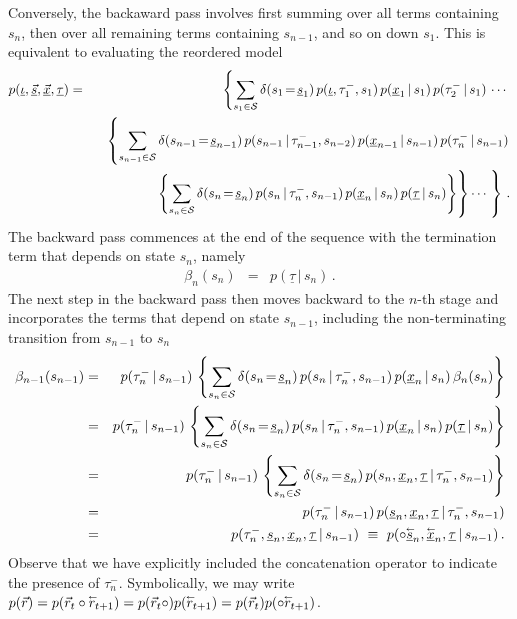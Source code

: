 \documentclass[a4paper]{article}
\newcommand{\rvec}[1]{\accentset{\leftarrow}{#1}}
\newcommand{\ui}{\underline{\iota}}
\newcommand{\ut}{\underline{\tau}}
\newcommand{\vr}{\vec{r}}
\newcommand{\tm}{\tau^{-}}
\begin{document}
Conversely, the backaward pass involves first summing over all terms containing $s_n$,
then over all remaining terms containing $s_{n-1}$, and so on down $s_1$.
This is equivalent to evaluating the reordered model
\begin{eqnarray}
   p(\ui,\underline{\vec{s}},\underline{\vec{x}},\ut) 
& = & 
   \left\{\sum_{s_1\in{\cal S}}\delta(s_1\!=\!\underline{s}_1)\,
p(\ui,\tm_1,s_1)\,p(\underline{x}_1\,|\,s_1)\,p(\tm_2\,|\,s_1)\,
\cdots\right.
\nonumber\\&&
\;\;\;\left\{\sum_{s_{n-1}\in{\cal S}}\delta(s_{n-1}\!=\!\underline{s}_{n-1})\,
p(s_{n-1}\,|\,\tm_{n-1},s_{n-2})\,p(\underline{x}_{n-1}\,|\,s_{n-1})\,p(\tm_n\,|\,s_{n-1})\right.
\nonumber\\&&
\hspace*{4mm}
\left.\rule{0pt}{7mm}\left\{\sum_{s_n\in{\cal S}}\delta(s_n\!=\!\underline{s}_n)\,
p(s_n\,|\,\tm_n,s_{n-1})\,p(\underline{x}_{n}\,|\,s_n)
\,p(\ut\,|\,s_n)\right\}\right\}
\cdots\left.\rule{0pt}{7mm}\right\}
\,.
\label{eq:backward}
\end{eqnarray}
The backward pass commences at the end of the sequence with the termination term that depends on state $s_n$, namely 
\begin{eqnarray}
  \beta_n(s_n) & = & p(\ut\,|\,s_n)\,.
\label{eq:_beta_n}
\end{eqnarray}
The next step in the backward pass then moves backward to the $n$-th stage and incorporates the terms that depend on state $s_{n-1}$, including the
non-terminating transition from $s_{n-1}$ to $s_n$
\begin{eqnarray}
  \beta_{n-1}(s_{n-1}) & = &
p(\tm_n\,|\,s_{n-1})\,\left\{\sum_{s_n\in{\cal S}}\delta(s_n\!=\!\underline{s}_n)\,
p(s_n\,|\,\tm_n,s_{n-1})\,p(\underline{x}_{n}\,|\,s_n)
\,\beta_n(s_n)\right\}
\nonumber\\&=&
p(\tm_n\,|\,s_{n-1})\,\left\{\sum_{s_n\in{\cal S}}\delta(s_n\!=\!\underline{s}_n)\,
p(s_n\,|\,\tm_n,s_{n-1})\,p(\underline{x}_{n}\,|\,s_n)
\,p(\ut\,|\,s_n)\right\}
\nonumber\\&=&
p(\tm_n\,|\,s_{n-1})\,\left\{\sum_{s_n\in{\cal S}}\delta(s_n\!=\!\underline{s}_n)\,
p(s_n,\underline{x}_{n},\ut\,|\,\tm_n,s_{n-1})\right\}
\nonumber\\&=&
p(\tm_n\,|\,s_{n-1})\,p(\underline{s}_n,\underline{x}_n,\ut\,|\,\tm_n,s_{n-1})
\nonumber\\&=&
p(\tm_n,\underline{s}_n,\underline{x}_n,\ut\,|\,s_{n-1})
~\equiv~p(\circ\underline{\rvec{s}}_n,\underline{\rvec{x}}_n,\ut\,|\,s_{n-1})\,.
\end{eqnarray}
Observe that we have explicitly included the concatenation operator to indicate the presence of $\tm_{n}$. 
Symbolically, we may write $p(\vr)=p(\vr_t\circ\rvec{r}_{t+1})=p(\vr_t\circ)p(\rvec{r}_{t+1})=p(\vr_t)p(\circ\rvec{r}_{t+1})$.
\end{document}

